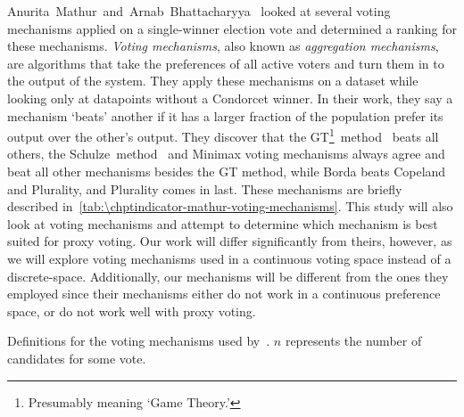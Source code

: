 Anurita~Mathur~and~Arnab~Bhattacharyya~\cite{Mathur2017} looked at several voting
mechanisms applied on a single-winner election vote and determined a ranking for
these mechanisms.
\textit{Voting mechanisms}, also known as \textit{aggregation mechanisms}, are
algorithms that take the preferences of all active voters and turn them in to the
output of the system.
They apply these mechanisms on a dataset while looking only at datapoints without a
Condorcet  winner.
In their work, they say a mechanism `beats' another if it has a larger fraction of
the population prefer its output over the other's output.
They discover that the   GT\footnote{
    Presumably meaning `Game Theory.'
}~method~\cite{Rivest2010} beats all others, the Schulze~method~\cite{Schulze2011}
and Minimax voting mechanisms always agree and beat all other mechanisms besides the
GT method, while Borda beats Copeland and Plurality, and Plurality comes in last.
These mechanisms are briefly described in~\autoref{tab:\chptindicator-mathur-voting-mechanisms}.
This study will also look at voting mechanisms and attempt to determine which
mechanism is best suited for proxy voting.
Our work will differ significantly from theirs, however, as we will explore voting
mechanisms used in a continuous voting space instead of a discrete-space.
Additionally, our mechanisms will be different from the ones they employed since
their mechanisms either do not work in a continuous preference space, or do not work
well with proxy voting.  

\begin{table}[htbp]
    \renewcommand{\arraystretch}{1.3}

    \caption{
        Definitions for the voting mechanisms used by~\cite{Mathur2017}.
        $n$ represents the number of candidates for some vote.
    }
    \label{tab:\chptindicator-mathur-voting-mechanisms}

    \centering
    
\end{table}


